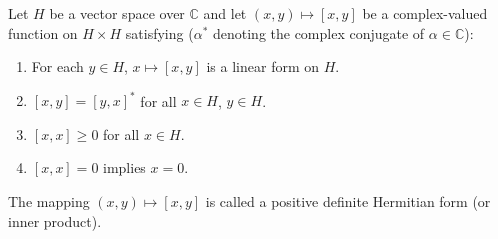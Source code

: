 Let $H$ be a vector space over $\mathbb{C}$ and let $(x, y) \mapsto [x, y]$ be a complex-valued function on $H \times H$ satisfying ($\alpha^*$ denoting the complex conjugate of $\alpha \in \mathbb{C}$):

\begin{enumerate}
\item[(i)] For each $y \in H$, $x \mapsto [x, y]$ is a linear form on $H$.
\item[(ii)] $[x, y] = [y, x]^*$ for all $x \in H$, $y \in H$.
\item[(iii)] $[x, x] \geq 0$ for all $x \in H$.
\item[(iv)] $[x, x] = 0$ implies $x = 0$.
\end{enumerate}

The mapping $(x, y) \mapsto [x, y]$ is called a positive definite Hermitian form (or inner product).
